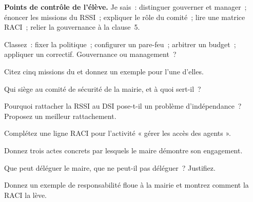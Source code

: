 \begin{boxinfo}
\textbf{Points de contrôle de l'élève.} Je sais~: distinguer gouverner et
manager~; énoncer les missions du RSSI~; expliquer le rôle du comité~; lire une
matrice RACI~; relier la gouvernance à la clause~5.
\end{boxinfo}

\bigskip

\begin{boxexo}[title={\ding{45}\quad Exercice~4.1. Gouverner ou manager \niveaubase}]
Classez~: fixer la politique~; configurer un pare-feu~; arbitrer un budget~;
appliquer un correctif. Gouvernance ou management~?
\end{boxexo}

\begin{boxexo}[title={\ding{45}\quad Exercice~4.2. Missions du RSSI \niveaubase}]
Citez cinq missions du  et donnez un exemple pour l'une d'elles.
\end{boxexo}

\begin{boxexo}[title={\ding{45}\quad Exercice~4.3. Le comité \niveaubase}]
Qui siège au comité de sécurité de la mairie, et à quoi sert-il~?
\end{boxexo}

\begin{boxexo}[title={\ding{45}\quad Exercice~4.4. Juge et partie \niveaumoyen}]
Pourquoi rattacher la RSSI au DSI pose-t-il un problème d'indépendance~?
Proposez un meilleur rattachement.
\end{boxexo}

\begin{boxexo}[title={\ding{45}\quad Exercice~4.5. RACI \niveaumoyen}]
Complétez une ligne RACI pour l'activité « gérer les accès des agents ».
\end{boxexo}

\begin{boxexo}[title={\ding{45}\quad Exercice~4.6. Leadership \niveaumoyen}]
Donnez trois actes concrets par lesquels le maire démontre son engagement.
\end{boxexo}

\begin{boxexo}[title={\ding{45}\quad Exercice~4.7. Délégation \niveaumoyen}]
Que peut déléguer le maire, que ne peut-il pas déléguer~? Justifiez.
\end{boxexo}

\begin{boxexo}[title={\ding{45}\quad Exercice~4.8. Zone floue \niveaumoyen}]
Donnez un exemple de responsabilité floue à la mairie et montrez comment la
RACI la lève.
\end{boxexo}

